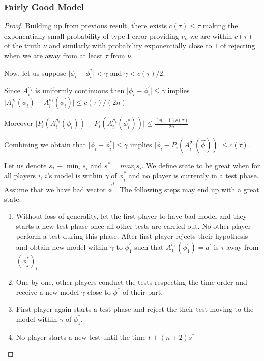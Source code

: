 \documentclass[]{spie}  %
\begin{document}
\subsubsection{Fairly Good Model}
\begin{proof}
Building up from previous result, there exists $c(\tau) \leq \tau$ making the exponentially small probability of type-I error providing $\nu_o$ we are within $c(\tau)$ of the truth $\nu$ and similarly with probability exponentially close to $1$ of rejecting when we are away from at least $\tau$ from $\nu$. 

Now, let us suppose $\lvert \phi_i - \phi_i^* \rvert < \gamma$ and $\gamma < c(\tau)/2$. 

Since $A_i^{\sigma_i}$ is uniformly continuous then $\lvert \phi_i - \phi_i^{'} \rvert \leq \gamma $ implies $\lvert A_i^{\sigma_i}(\phi_i) - A_i^{\sigma_i}(\phi_i^{'}) \rvert \leq c(\tau)/(2n)$

Moreover $\lvert P_i(A_i^{\sigma_i}(\phi_i)) - P_i(A_i^{\sigma_i}(\phi_i^*)) \rvert \leq \frac{(n-1)c(\tau)}{2n} $

Combining we obtain that $\lvert \phi_i - \phi_i^* \rvert \leq \gamma $ implies $\lvert \phi_i - P_i(A_i^{\sigma_i}(\overrightarrow{\phi})) \rvert \leq c(\tau)$.

Let us denote $s_* \equiv \min_i s_i$ and $s^* = max_i s_i$.
\newpage
We define state to be great when for all players $i$, $i$'s model is within $\gamma$ of $\phi_i^*$ and no player is currently in a test phase. Assume that we have bad vector $\overrightarrow{\phi}^t$. The following steps may end up with a great state.
\begin{enumerate}
    \item Without loss of generality, let the first player to have bad model and they starts a new test phase once all other tests are carried out. No other player perform a test during this phase. After first player rejects their hypothesis and obtain new model within $\gamma$ to $\phi_1^{'}$ such that $A_1^{\sigma_1}(\phi_1^{'}) = a^{'}$ is $\tau$ away from $(\phi_j^*)_i$
    \item One by one, other players conduct the tests respecting the time order and receive a new model $\gamma$-close to $\phi^*$ of their part.
    \item First player again starts a test phase and reject the their test moving to the model within $\gamma$ of $\phi_1^*$. 
    \item No player starts a new test until the time $t + (n+2)s^*$
\end{enumerate}


\end{proof}
\end{document}
